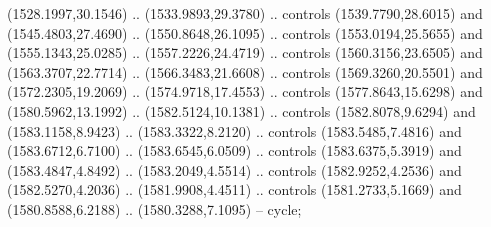 \begin{scope}[shift={(-22.88722,-49.76189)}]
\begin{scope}[shift={(-739.46591,328.36782)}]
      (1528.1997,30.1546) .. (1533.9893,29.3780) .. controls (1539.7790,28.6015) and
      (1545.4803,27.4690) .. (1550.8648,26.1095) .. controls (1553.0194,25.5655) and
      (1555.1343,25.0285) .. (1557.2226,24.4719) .. controls (1560.3156,23.6505) and
      (1563.3707,22.7714) .. (1566.3483,21.6608) .. controls (1569.3260,20.5501) and
      (1572.2305,19.2069) .. (1574.9718,17.4553) .. controls (1577.8643,15.6298) and
      (1580.5962,13.1992) .. (1582.5124,10.1381) .. controls (1582.8078,9.6294) and
      (1583.1158,8.9423) .. (1583.3322,8.2120) .. controls (1583.5485,7.4816) and
      (1583.6712,6.7100) .. (1583.6545,6.0509) .. controls (1583.6375,5.3919) and
      (1583.4847,4.8492) .. (1583.2049,4.5514) .. controls (1582.9252,4.2536) and
      (1582.5270,4.2036) .. (1581.9908,4.4511) .. controls (1581.2733,5.1669) and
      (1580.8588,6.2188) .. (1580.3288,7.1095) -- cycle;


\end{scope}
\end{scope}
